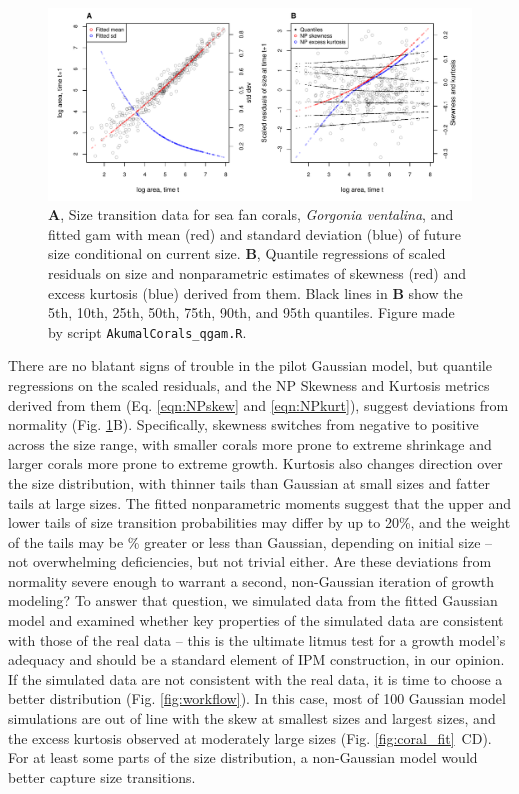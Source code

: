 \documentclass[12pt]{article}
\begin{document}
\begin{figure}[tbp]
	\centering
	\includegraphics[width=1.0\textwidth]{figures/coral_qgam_diagnostics.pdf}
	\caption{\textbf{A}, Size transition data for sea fan corals, \emph{Gorgonia ventalina}, and fitted gam with mean (red) and standard deviation (blue) of future size conditional on current size.  \textbf{B}, Quantile regressions of scaled residuals on size and nonparametric estimates of skewness (red) and excess kurtosis (blue) derived from them. Black lines in \textbf{B} show the 5th, 10th, 25th, 50th, 75th, 90th, and 95th quantiles. Figure made by script \texttt{AkumalCorals\_qgam.R}.}
	\label{fig:coral_diagnostics}
\end{figure} 

There are no blatant signs of trouble in the pilot Gaussian model, but quantile regressions on the scaled residuals, and the NP Skewness and Kurtosis metrics derived from them (Eq. \ref{eqn:NPskew} and \ref{eqn:NPkurt}), suggest deviations from normality (Fig. \ref{fig:coral_diagnostics}B).
Specifically, skewness switches from negative to positive across the size range, with smaller corals more prone to extreme shrinkage and larger corals more prone to extreme growth.  
Kurtosis also changes direction over the size distribution, with thinner tails than Gaussian at small sizes and fatter tails at large sizes. 
The fitted nonparametric moments suggest that the upper and lower tails of size transition probabilities may differ by up to 20\%, and the weight of the tails may be \% greater or less than Gaussian, depending on initial size -- not overwhelming deficiencies, but not trivial either. 
Are these deviations from normality severe enough to warrant a second, non-Gaussian iteration of growth modeling? 
To answer that question, we simulated data from the fitted Gaussian model and examined whether key properties of the simulated data are consistent with those of the real data -- this is the ultimate litmus test for a growth model's adequacy and should be a standard element of IPM construction, in our opinion.
If the simulated data are not consistent with the real data, it is time to choose a better distribution (Fig. \ref{fig:workflow}). 
In this case, most of 100 Gaussian model simulations are out of line with the skew at smallest sizes and largest sizes, and the excess kurtosis observed at moderately large sizes (Fig. \ref{fig:coral_fit}~CD). For at least some parts of the size distribution, a non-Gaussian model would better capture size transitions. 
\end{document}
